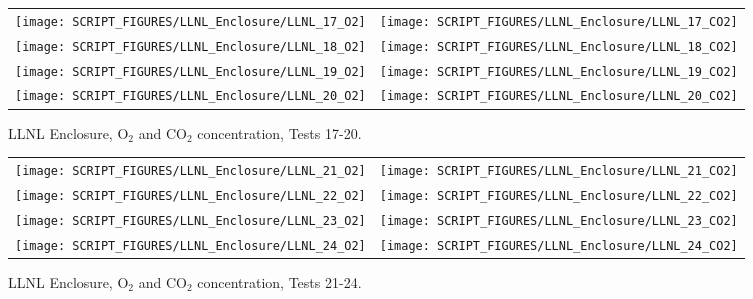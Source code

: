 \begin{figure}[p]
\begin{tabular*}{\textwidth}{l@{\extracolsep{\fill}}r}
\texttt{[image: SCRIPT\_FIGURES/LLNL\_Enclosure/LLNL\_17\_O2]} &
\texttt{[image: SCRIPT\_FIGURES/LLNL\_Enclosure/LLNL\_17\_CO2]} \\
\texttt{[image: SCRIPT\_FIGURES/LLNL\_Enclosure/LLNL\_18\_O2]} &
\texttt{[image: SCRIPT\_FIGURES/LLNL\_Enclosure/LLNL\_18\_CO2]} \\
\texttt{[image: SCRIPT\_FIGURES/LLNL\_Enclosure/LLNL\_19\_O2]} &
\texttt{[image: SCRIPT\_FIGURES/LLNL\_Enclosure/LLNL\_19\_CO2]} \\
\texttt{[image: SCRIPT\_FIGURES/LLNL\_Enclosure/LLNL\_20\_O2]} &
\texttt{[image: SCRIPT\_FIGURES/LLNL\_Enclosure/LLNL\_20\_CO2]}
\end{tabular*}
\caption[LLNL Enclosure, O$_2$ and CO$_2$ concentration, Tests 17-20]{LLNL Enclosure, O$_2$ and CO$_2$ concentration, Tests 17-20.}
\label{LLNL_Gas_5}
\end{figure}

\begin{figure}[p]
\begin{tabular*}{\textwidth}{l@{\extracolsep{\fill}}r}
\texttt{[image: SCRIPT\_FIGURES/LLNL\_Enclosure/LLNL\_21\_O2]} &
\texttt{[image: SCRIPT\_FIGURES/LLNL\_Enclosure/LLNL\_21\_CO2]} \\
\texttt{[image: SCRIPT\_FIGURES/LLNL\_Enclosure/LLNL\_22\_O2]} &
\texttt{[image: SCRIPT\_FIGURES/LLNL\_Enclosure/LLNL\_22\_CO2]} \\
\texttt{[image: SCRIPT\_FIGURES/LLNL\_Enclosure/LLNL\_23\_O2]} &
\texttt{[image: SCRIPT\_FIGURES/LLNL\_Enclosure/LLNL\_23\_CO2]} \\
\texttt{[image: SCRIPT\_FIGURES/LLNL\_Enclosure/LLNL\_24\_O2]} &
\texttt{[image: SCRIPT\_FIGURES/LLNL\_Enclosure/LLNL\_24\_CO2]}
\end{tabular*}
\caption[LLNL Enclosure, O$_2$ and CO$_2$ concentration, Tests 21-24]{LLNL Enclosure, O$_2$ and CO$_2$ concentration, Tests 21-24.}
\label{LLNL_Gas_6}
\end{figure}

